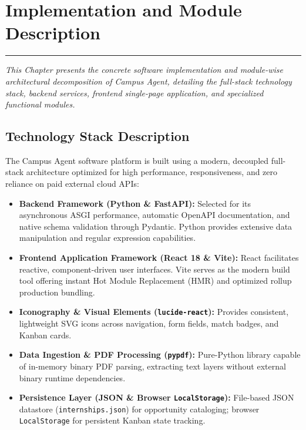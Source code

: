 \chapter{Implementation and Module Description}
\label{C5} %
\graphicspath{{images/}{Figures/}}
\noindent\rule{\linewidth}{2pt}
\textit{This Chapter presents the concrete software implementation and module-wise architectural decomposition of Campus Agent, detailing the full-stack technology stack, backend services, frontend single-page application, and specialized functional modules.}
\section{Technology Stack Description} \label{S5.1}
The Campus Agent software platform is built using a modern, decoupled full-stack architecture optimized for high performance, responsiveness, and zero reliance on paid external cloud APIs:

\begin{itemize}
	\item \textbf{Backend Framework (Python \& FastAPI):} Selected for its asynchronous ASGI performance, automatic OpenAPI documentation, and native schema validation through Pydantic. Python provides extensive data manipulation and regular expression capabilities.
	\item \textbf{Frontend Application Framework (React 18 \& Vite):} React facilitates reactive, component-driven user interfaces. Vite serves as the modern build tool offering instant Hot Module Replacement (HMR) and optimized rollup production bundling.
	\item \textbf{Iconography \& Visual Elements (\texttt{lucide-react}):} Provides consistent, lightweight SVG icons across navigation, form fields, match badges, and Kanban cards.
	\item \textbf{Data Ingestion \& PDF Processing (\texttt{pypdf}):} Pure-Python library capable of in-memory binary PDF parsing, extracting text layers without external binary runtime dependencies.
	\item \textbf{Persistence Layer (JSON \& Browser \texttt{LocalStorage}):} File-based JSON datastore (\texttt{internships.json}) for opportunity cataloging; browser \texttt{LocalStorage} for persistent Kanban state tracking.
\end{itemize}

